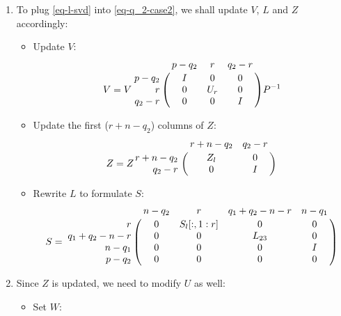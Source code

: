 \begin{enumerate}
\begin{enumerate}
\begin{itemize}
                    \end{itemize} 
                \item To plug \eqref{eq-l-svd} into \eqref{eq-q_2-case2}, we shall update $V$, $L$ and $Z$ accordingly:
                    \begin{itemize}
                        \item Update $V$:
                            \begin{displaymath}
                                V = V\bordermatrix{ & p-q_2 & r & q_2-r \cr
                                    \hfill p-q_2 & I & 0 & 0 \cr
                                    \hfill r & 0 & U_{r} & 0 \cr
                                    \hfill q_2-r & 0 & 0 & I}P^{-1}
                            \end{displaymath}
                        \item Update the first ($r+n-q_2$) columns of $Z$:
                            \begin{displaymath}
                                Z = Z\bordermatrix{ & r+n-q_2 & q_2-r \cr
                                    \hfill r+n-q_2 & Z_{l} & 0 \cr
                                    \hfill q_2-r & 0 & I}
                            \end{displaymath}
                        \item Rewrite $L$ to formulate $S$:
                            \begin{displaymath}
                                S = \bordermatrix{ & n-q_2 & r & q_1+q_2-n-r & n-q_1 \cr
                                    \hfill r & 0 & S_{l}[:,1:r] & 0 & 0 \cr
                                    \hfill q_1+q_2-n-r & 0 & 0 & L_{23} & 0 \cr
                                    \hfill n-q_1 & 0 & 0 & 0 & I \cr
                                    \hfill p-q_2 & 0 & 0 & 0 & 0 }
                            \end{displaymath}
                    \end{itemize}
                \item Since $Z$ is updated, we need to modify $U$ as well:
                        \begin{itemize}
                            \item Set $W$:
                            

\end{itemize}
\end{enumerate}
\end{enumerate}
